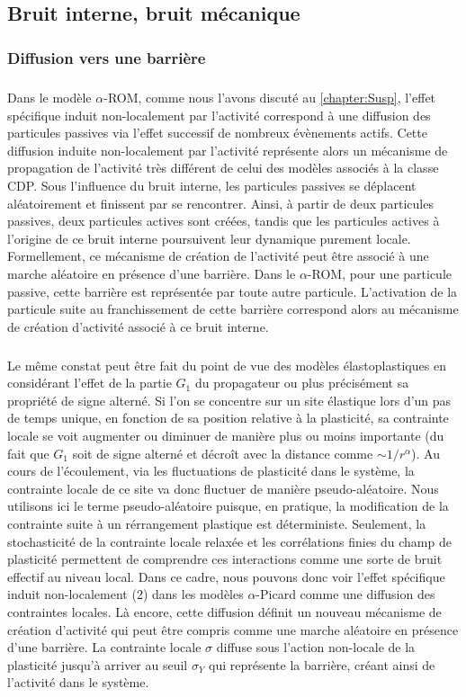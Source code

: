 \endgroup

\subsection{Bruit interne, bruit mécanique}

\subsubsection{Diffusion vers une barrière}

\subparagraph{}Dans le modèle $\alpha$-ROM, comme nous l'avons discuté au \autoref{chapter:Susp}, l'effet spécifique induit non-localement par l'activité correspond à une diffusion des particules passives via l'effet successif de nombreux évènements actifs. Cette diffusion induite non-localement par l'activité représente alors un mécanisme de propagation de l'activité très différent de celui des modèles associés à la classe CDP. Sous l’influence du bruit interne, les particules passives se déplacent aléatoirement et finissent par se rencontrer. Ainsi, à partir de deux particules passives, deux particules actives sont créées, tandis que les particules actives à l'origine de ce bruit interne poursuivent leur dynamique purement locale. Formellement, ce mécanisme de création de l'activité peut être associé à une marche aléatoire en présence d'une barrière. Dans le $\alpha$-ROM, pour une particule passive, cette barrière est représentée par toute autre particule. L'activation de la particule suite au franchissement de cette barrière correspond alors au mécanisme de création d'activité associé à ce bruit interne.

\subparagraph{}Le même constat peut être fait du point de vue des modèles élastoplastiques en considérant l'effet de la partie $G_1$ du propagateur ou plus précisément sa propriété de signe alterné. Si l'on se concentre sur un site élastique lors d'un pas de temps unique, en fonction de sa position relative à la plasticité, sa contrainte locale se voit augmenter ou diminuer de manière plus ou moins importante (du fait que $G_1$ soit de signe alterné et décroît avec la distance comme $\sim 1/r^\alpha$). Au cours de l'écoulement, via les fluctuations de plasticité dans le système, la contrainte locale de ce site va donc fluctuer de manière pseudo-aléatoire. Nous utilisons ici le terme pseudo-aléatoire puisque, en pratique, la modification de la contrainte suite à un rérrangement plastique est déterministe. Seulement, la stochasticité de la contrainte locale relaxée et les corrélations finies du champ de plasticité permettent de comprendre ces interactions comme une sorte de bruit effectif au niveau local. Dans ce cadre, nous pouvons donc voir l'effet spécifique induit non-localement (2) dans les modèles $\alpha$-Picard comme une diffusion des contraintes locales. Là encore, cette diffusion définit un nouveau mécanisme de création d'activité qui peut être compris comme une marche aléatoire en présence d'une barrière. La contrainte locale $\sigma$ diffuse sous l'action non-locale de la plasticité jusqu'à arriver au seuil $\sigma_Y$ qui représente la barrière, créant ainsi de l'activité dans le système. 

